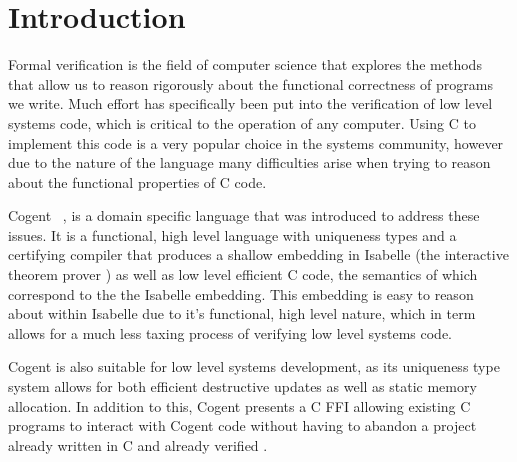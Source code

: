 \chapter{Introduction}\label{ch:intro}

Formal verification is the field of computer science that explores the methods that allow us to
  reason rigorously about the functional correctness of programs we write. 
Much effort has specifically been put into the verification of low level systems code,
  which is critical to the operation of any computer.
Using C to implement this code is a very popular choice in the systems community,
  however due to the nature of the language many difficulties arise when trying to
  reason about the functional properties of C code.

Cogent~\citep{OCo16} , 
is a domain specific language that was introduced to address these issues.
It is a functional, high level language with uniqueness types and a certifying compiler
  that produces a shallow embedding in Isabelle  (the interactive theorem prover ) as well as low level efficient C code,
  the semantics of which correspond to the the Isabelle embedding. 
This embedding is easy to reason about within Isabelle due to it's functional,
  high level nature, which in term allows for a much less taxing process of verifying low level systems code. 

Cogent is also suitable for low level systems development,
  as its uniqueness type system allows for both efficient destructive updates as well as static memory allocation.
In addition to this, Cogent presents a C FFI allowing existing C programs to interact with Cogent code without having to
  abandon a project already written in C and already verified .

